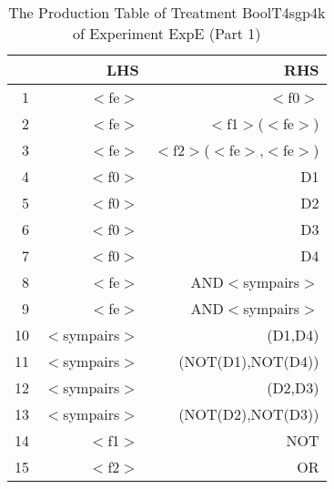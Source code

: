 \begin{table}[ht]
\centering
\begin{tabular}{rrr}
  \hline
 & LHS & RHS \\ 
  \hline
1 & $<$fe$>$ & $<$f0$>$ \\ 
  2 & $<$fe$>$ & $<$f1$>$($<$fe$>$) \\ 
  3 & $<$fe$>$ & $<$f2$>$($<$fe$>$,$<$fe$>$) \\ 
  4 & $<$f0$>$ & D1 \\ 
  5 & $<$f0$>$ & D2 \\ 
  6 & $<$f0$>$ & D3 \\ 
  7 & $<$f0$>$ & D4 \\ 
  8 & $<$fe$>$ & AND$<$sympairs$>$ \\ 
  9 & $<$fe$>$ & AND$<$sympairs$>$ \\ 
  10 & $<$sympairs$>$ & (D1,D4) \\ 
  11 & $<$sympairs$>$ & (NOT(D1),NOT(D4)) \\ 
  12 & $<$sympairs$>$ & (D2,D3) \\ 
  13 & $<$sympairs$>$ & (NOT(D2),NOT(D3)) \\ 
  14 & $<$f1$>$ & NOT \\ 
  15 & $<$f2$>$ & OR \\ 
   \hline
\end{tabular}
\caption{The Production Table of Treatment BoolT4sgp4k of Experiment ExpE (Part 1)} 
\end{table}
